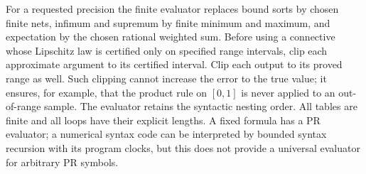 For a requested precision the finite evaluator replaces bound sorts by
chosen finite nets, infimum and supremum by finite minimum and maximum,
and expectation by the chosen rational weighted sum. Before using a
connective whose Lipschitz law is certified only on specified range
intervals, clip each approximate argument to its certified interval.
Clip each output to its proved range as well. Such clipping cannot
increase the error to the true value; it ensures, for example, that
the product rule on $[0,1]$ is never applied to an out-of-range sample.
The evaluator retains the syntactic nesting order. All tables are finite and all loops have their
explicit lengths. A fixed formula has a PR evaluator; a numerical syntax
code can be interpreted by bounded syntax recursion with its program
clocks, but this does not provide a universal evaluator for arbitrary PR
symbols.

